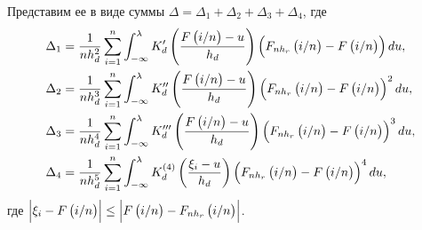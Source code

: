 \documentclass[a4paper,14pt,russian]{article}
\begin{document}
 Представим ее в виде суммы $\Delta= \Delta_{1} + \Delta_{2}+ \Delta_{3}+ \Delta_{4}$, где
 \begin{subequations}
 \begin{align}
   \Delta_{1} &= \frac{1}{n h_d^2} \sum_{i =1}^n \int_{-\infty}^{\lambda}K_d'\left(\frac{F\left(i/n\right)-u}{h_d}\right)\left(F_{n h_r}\left(i/n\right)- F\left(i/n\right)\right)du, \label{xla1Delta11}\\
   \Delta_{2} &=\frac{1}{n h_d^3} \sum_{i =1}^n \int_{-\infty}^{\lambda}K_d''\left(\frac{F\left(i/n\right)-u}{h_d}\right)\left(F_{n h_r}\left(i/n\right)- F\left(i/n\right)\right)^2du,\label{xla1Delta12}\\
   \Delta_{3} &=\frac{1}{n h_d^4} \sum_{i =1}^n \int_{-\infty}^{\lambda}K_d'''\left(\frac{F\left(i/n\right)-u}{h_d}\right)\left(F_{n h_r}\left(i/n\right)- F\left(i/n\right)\right)^3du,\label{xla1Delta13}\\
   \Delta_{4} &=\frac{1}{n h_d^5} \sum_{i =1}^n \int_{-\infty}^{\lambda}K_d^{(4)}\left(\frac{\xi_i-u}{h_d}\right)\left(F_{n h_r}\left(i/n\right)- F\left(i/n\right)\right)^4du,\label{xla1Delta14}
 \end{align}
 \end{subequations}
 где  $ \left|\xi_i - F\left(i/n\right)\right|\leq \left|F\left(i/n\right)-F_{n h_r}\left(i/n\right)\right|$.
\end{document}
